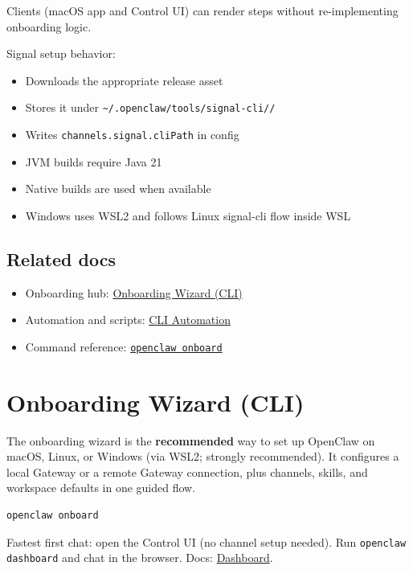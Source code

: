 Clients (macOS app and Control UI) can render steps without re-implementing onboarding logic.

Signal setup behavior:

\begin{itemize}
  \item Downloads the appropriate release asset
  \item Stores it under \texttt{\textasciitilde{}/.openclaw/tools/signal-cli//}
  \item Writes \texttt{channels.signal.cliPath} in config
  \item JVM builds require Java 21
  \item Native builds are used when available
  \item Windows uses WSL2 and follows Linux signal-cli flow inside WSL
\end{itemize}


\subsection{Related docs}


\begin{itemize}
  \item Onboarding hub: \href{/start/wizard}{Onboarding Wizard (CLI)}
  \item Automation and scripts: \href{/start/wizard-cli-automation}{CLI Automation}
  \item Command reference: \href{/cli/onboard}{\texttt{openclaw onboard}}
\end{itemize}



\clearpage

\section{Onboarding Wizard (CLI)}


The onboarding wizard is the \textbf{recommended} way to set up OpenClaw on macOS,
Linux, or Windows (via WSL2; strongly recommended).
It configures a local Gateway or a remote Gateway connection, plus channels, skills,
and workspace defaults in one guided flow.

\begin{lstlisting}[language=bash]
openclaw onboard
\end{lstlisting}


Fastest first chat: open the Control UI (no channel setup needed). Run
\texttt{openclaw dashboard} and chat in the browser. Docs: \href{/web/dashboard}{Dashboard}.

